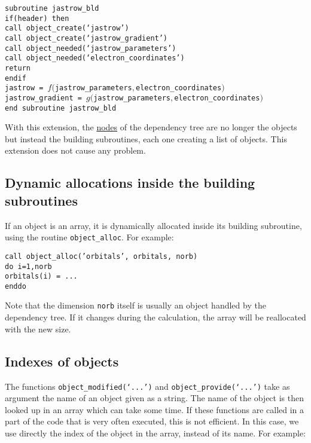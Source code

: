 \documentclass[a4paper,11pt]{article}
\newcommand\Def[1]{\underline{#1}}
\begin{document}
\vspace{0.5cm}
\noindent
{\tt subroutine jastrow_bld\\
if(header) then\\
\phantom{xx} call object_create(`jastrow')\\
\phantom{xx} call object_create(`jastrow_gradient')\\
\phantom{xx} call object_needed(`jastrow_parameters')\\
\phantom{xx} call object_needed(`electron_coordinates')\\
\phantom{xx} return\\
endif\\
jastrow  = $f(${\tt jastrow_parameters}$,${\tt electron_coordinates}$)$\\
jastrow_gradient  = $g(${\tt jastrow_parameters}$,${\tt electron_coordinates}$)$\\
end subroutine jastrow_bld}

\vspace{0.5cm}
With this extension, the \Def{nodes} of the dependency tree are no longer the objects but instead the building subroutines, each one creating a list of objects. This extension does not cause any problem.

\subsection{Dynamic allocations inside the building subroutines}

If an object is an array, it is dynamically allocated inside its building subroutine, using the routine {\tt object_alloc}. For example:

\vspace{0.5cm}
\noindent
{\tt call object_alloc('orbitals', orbitals, norb)\\
do i=1,norb\\
\phantom{xx} orbitals(i) = ...\\
enddo}
\vspace{0.5cm}

Note that the dimension {\tt norb} itself is usually an object handled by the dependency tree. If it changes during the calculation, the array will be reallocated with the new size.

\subsection{Indexes of objects}
The functions {\tt object_modified(`...')} and {\tt object_provide(`...')} take as argument the name of an object given as a string. The name of the object is then looked up in an array which can take some time. If these functions are called in a part of the code that is very often executed, this is not efficient. In this case, we use directly the index of the object in the array, instead of its name. For example:
\end{document}
